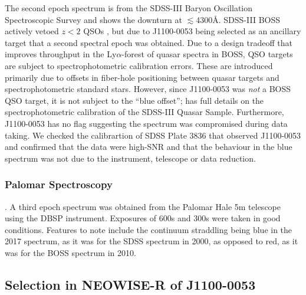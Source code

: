 \documentclass[11pt,a4paper]{article}
\begin{document}
The second epoch spectrum is from the SDSS-III Baryon Oscillation Spectroscopic Survey \citep[BOSS; ][]{Dawson2013} and shows the downturn at $\lesssim$4300\AA. SDSS-III BOSS actively vetoed $z<2$ QSOs \citep{Ross2012}, but due to J1100-0053 being selected as an ancillary target \citep[via a white dwarf program;][]{Kepler2015, Kepler2016} that a second spectral epoch was obtained. Due to a design tradeoff that improves throughput in the Ly$\alpha$-forest of quasar spectra in BOSS, QSO targets are subject to spectrophotometric calibration errors. These are introduced primarily due to offsets in fiber-hole positioning between quasar targets and spectrophotometric standard stars. However, since J1100-0053 was {\it not} a BOSS QSO target, it is not subject to the ``blue offset''; \cite{Margala2016} has full details on the spectrophotometric calibration of the SDSS-III Quasar Sample. Furthermore, J1100-0053 has no flag suggesting the spectrum was compromised during data taking. We checked the calibrartion of SDSS Plate 3836 that observed J1100-0053 and confirmed that the data were high-SNR and that the behaviour in the blue spectrum was not due to the instrument, telescope or data reduction. 

\subsubsection{Palomar Spectroscopy} 
. A third epoch spectrum was obtained from the Palomar Hale 5m telescope using the DBSP instrument.  Exposures of 600s and 300s were taken in good conditions. Features to note include the continuum straddling \mgii being blue in the 2017 spectrum, as it was for the SDSS spectrum in 2000, as opposed to red, as it was for the BOSS spectrum in 2010.



\subsection{Selection in NEOWISE-R of J1100-0053}
\end{document}

